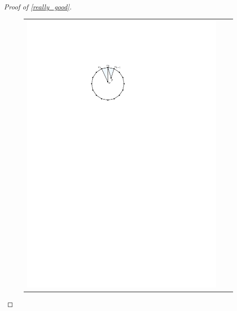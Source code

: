 \documentclass[a4paper,UKenglish,cleveref, autoref, thm-restate]{lipics-v2021}
\begin{document}
\begin{proof}[Proof of \cref{really_good}]
\begin{figure}
\begin{tabular}{ccc}
      \includegraphics[page=2]{figs/really_good} &

\end{tabular}
\end{figure}
\end{proof}
\end{document}
